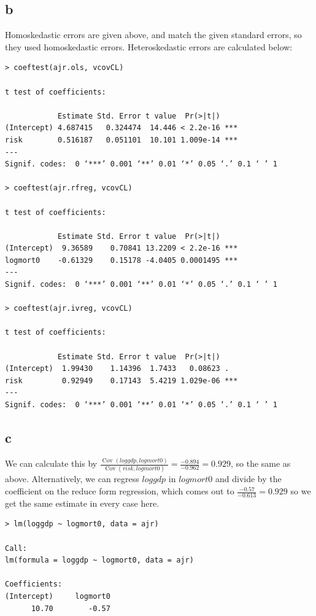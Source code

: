 \documentclass[12pt,letterpaper]{article}
\theoremstyle{definition}
\DeclareMathOperator{\Cov}{Cov}
\begin{document}
\subsection*{b}

Homoskedastic errors are given above, and match the given standard errors, so they used homoskedastic errors. Heteroskedastic errors are calculated below:
\begin{Verbatim}[fontsize=\small]
> coeftest(ajr.ols, vcovCL)

t test of coefficients:

            Estimate Std. Error t value  Pr(>|t|)
(Intercept) 4.687415   0.324474  14.446 < 2.2e-16 ***
risk        0.516187   0.051101  10.101 1.009e-14 ***
---
Signif. codes:  0 ‘***’ 0.001 ‘**’ 0.01 ‘*’ 0.05 ‘.’ 0.1 ‘ ’ 1

> coeftest(ajr.rfreg, vcovCL)

t test of coefficients:

            Estimate Std. Error t value  Pr(>|t|)
(Intercept)  9.36589    0.70841 13.2209 < 2.2e-16 ***
logmort0    -0.61329    0.15178 -4.0405 0.0001495 ***
---
Signif. codes:  0 ‘***’ 0.001 ‘**’ 0.01 ‘*’ 0.05 ‘.’ 0.1 ‘ ’ 1

> coeftest(ajr.ivreg, vcovCL)

t test of coefficients:

            Estimate Std. Error t value  Pr(>|t|)
(Intercept)  1.99430    1.14396  1.7433   0.08623 .
risk         0.92949    0.17143  5.4219 1.029e-06 ***
---
Signif. codes:  0 ‘***’ 0.001 ‘**’ 0.01 ‘*’ 0.05 ‘.’ 0.1 ‘ ’ 1
\end{Verbatim}

\subsection*{c}

We can calculate this by $\frac{\Cov(loggdp, logmort0)}{\Cov(risk, logmort0)} = \frac{-0.894}{-0.962} = 0.929$, so the same as above. Alternatively, we can regress $loggdp$ in $logmort0$ and divide by the coefficient on the reduce form regression, which comes out to $\frac{-0.57}{-0.613} = 0.929$ so we get the same estimate in every case here.
\begin{Verbatim}[fontsize=\small]
> lm(loggdp ~ logmort0, data = ajr)

Call:
lm(formula = loggdp ~ logmort0, data = ajr)

Coefficients:
(Intercept)     logmort0
      10.70        -0.57
\end{Verbatim}
\end{document}
